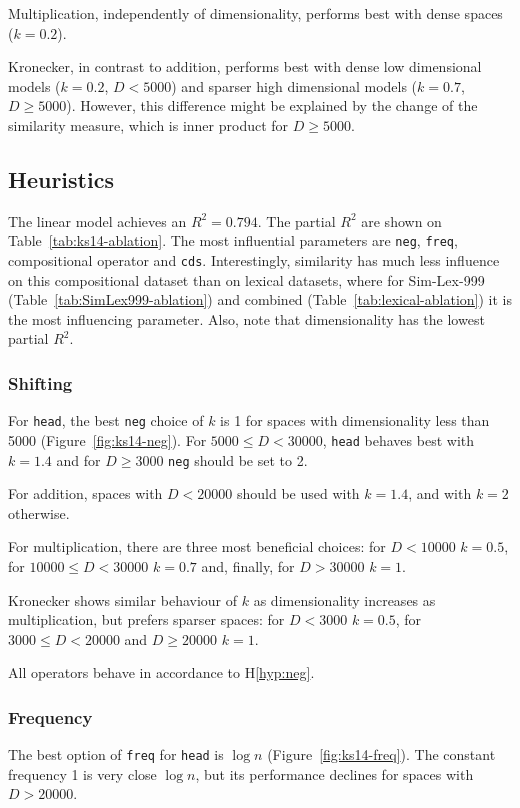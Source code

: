 Multiplication, independently of dimensionality, performs best with dense spaces ($k = 0.2$).

Kronecker, in contrast to addition, performs best with dense low dimensional models ($k = 0.2$, $D < 5000$) and sparser high dimensional models ($k = 0.7$, $D \geq 5000$). However, this difference might be explained by the change of the similarity measure, which is inner product for $D \geq 5000$.

\subsection{Heuristics}
\label{sec:heuristics}



The linear model achieves an $R^2 = 0.794$. The partial $R^2$ are shown on Table~\ref{tab:ks14-ablation}. The most influential parameters are \texttt{neg}, \texttt{freq}, compositional operator and \texttt{cds}. Interestingly, similarity has much less influence on this compositional dataset than on lexical datasets, where for Sim-Lex-999 (Table~\ref{tab:SimLex999-ablation}) and combined (Table~\ref{tab:lexical-ablation}) it is the most influencing parameter. Also, note that dimensionality has the lowest partial $R^2$.

\subsubsection{Shifting}


For \texttt{head}, the best \texttt{neg} choice of $k$ is 1 for spaces with dimensionality less than 5000 (Figure~\ref{fig:ks14-neg}). For $5000 \leq D < 30000$, \texttt{head} behaves best with $k = 1.4$ and for $D \geq 3000$ \texttt{neg} should be set to 2.

For addition, spaces with $D < 20000$ should be used with $k = 1.4$, and with $k = 2$ otherwise.

For multiplication, there are three most beneficial choices: for $D < 10000$ $k = 0.5$, for $10000 \leq D < 30000$ $k = 0.7$ and, finally, for $D > 30000$ $k = 1$.

Kronecker shows similar behaviour of $k$ as dimensionality increases as multiplication, but prefers sparser spaces: for $D < 3000$ $k = 0.5$, for $3000 \leq D < 20000$ and $D \geq 20000$ $k = 1$.

All operators behave in accordance to H\ref{hyp:neg}.

\subsubsection{Frequency}
The best option of \texttt{freq} for \texttt{head} is $\log n$ (Figure~\ref{fig:ks14-freq}). The constant frequency 1 is very close $\log n$, but its performance declines for spaces with $D > 20000$.


